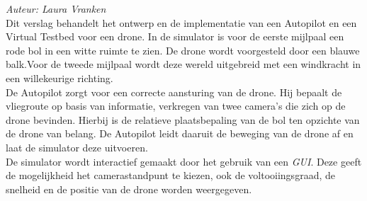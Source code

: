 \noindent
{\em Auteur: Laura Vranken }\\
Dit verslag behandelt het ontwerp en de implementatie van een Autopilot en een Virtual Testbed voor een drone. In de simulator is voor de eerste mijlpaal een rode bol in een witte ruimte te zien. De drone wordt voorgesteld door een blauwe balk.Voor de tweede mijlpaal wordt deze wereld uitgebreid met een windkracht in een willekeurige richting.
\\
De Autopilot zorgt voor een correcte aansturing van de drone. Hij bepaalt de vliegroute op basis van informatie, verkregen van twee camera's die zich op de drone bevinden. Hierbij is de relatieve plaatsbepaling van de bol ten opzichte van de drone van belang. De Autopilot leidt daaruit de beweging van de drone af en laat de simulator deze uitvoeren.
\\
De simulator wordt interactief gemaakt door het gebruik van een \textit{GUI}. Deze geeft de mogelijkheid het camerastandpunt te kiezen, ook de voltooiingsgraad, de snelheid en de positie van de drone worden weergegeven.


 

